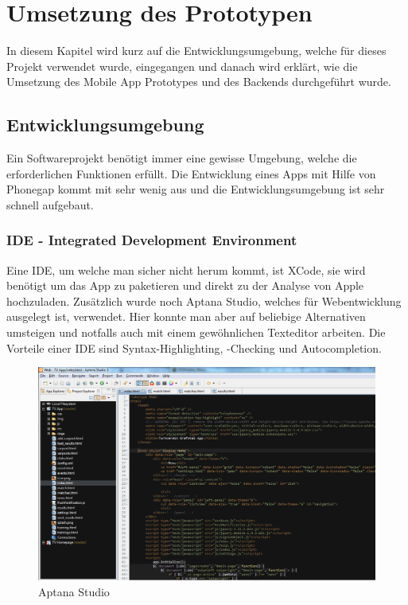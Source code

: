 %
%

\chapter{Umsetzung des Prototypen}\label{chap.umsetzung}
In diesem Kapitel wird kurz auf die Entwicklungsumgebung, welche für dieses Projekt verwendet wurde, eingegangen und danach wird erklärt, wie die Umsetzung des Mobile App Prototypes und des Backends durchgeführt wurde.

\section{Entwicklungsumgebung}\label{entwicklungsumgebung}
Ein Softwareprojekt benötigt immer eine gewisse Umgebung, welche die erforderlichen Funktionen erfüllt. Die Entwicklung eines Apps mit Hilfe von Phonegap kommt mit sehr wenig aus und die Entwicklungsumgebung ist sehr schnell aufgebaut.

\subsection{IDE - Integrated Development Environment}
Eine IDE, um welche man sicher nicht herum kommt, ist XCode, sie wird benötigt um das App zu paketieren und direkt zu der Analyse von Apple hochzuladen. Zusätzlich wurde noch Aptana Studio, welches für Webentwicklung ausgelegt ist, verwendet. Hier konnte man aber auf beliebige Alternativen umsteigen und notfalls auch mit einem gewöhnlichen Texteditor arbeiten. Die Vorteile einer IDE sind Syntax-Highlighting, -Checking und Autocompletion.

\begin{figure}[h]
\centering
\includegraphics[scale=0.5]{images/aptana.png}
\caption{Aptana Studio}
\label{fig:aptana}
\end{figure}



